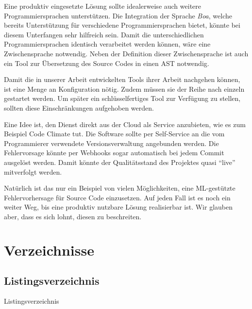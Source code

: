 \documentclass[10pt, a4paper]{article}
\makeatletter
\renewcommand{\lstlistingname}{Listingsverzeichnis}
\renewcommand\listoftables{%
	\subsection{\listtablename}%
	\@mkboth{\MakeUppercase\listtablename}%
	{\MakeUppercase\listtablename}%
	\@starttoc{lot}%
}
\renewcommand\listoffigures{%
	\subsection{\listfigurename}%
	\@mkboth{\MakeUppercase\listfigurename}%
	{\MakeUppercase\listfigurename}%
	\@starttoc{lof}%
}
\renewcommand\lstlistoflistings{%
	\subsection{\lstlistingname}%
	\@mkboth{\MakeUppercase\lstlistingname}%
	{\MakeUppercase\lstlistingname}%
	\@starttoc{lol}%
}
\makeatother
\begin{document}
Eine produktiv eingesetzte Lösung sollte idealerweise auch weitere Programmiersprachen unterstützen. Die Integration der Sprache \emph{Boa}, welche bereits Unterstützung für verschiedene Programmiersprachen bietet, könnte bei diesem Unterfangen sehr hilfreich sein. Damit die unterschiedlichen Programmiersprachen identisch verarbeitet werden können, wäre eine Zwischensprache notwendig. Neben der Definition dieser Zwischensprache ist auch ein Tool zur Übersetzung des Source Codes in einen \ac{AST} notwendig.

Damit die in unserer Arbeit entwickelten Tools ihrer Arbeit nachgehen kön\-nen, ist eine Menge an Konfiguration nötig. Zudem müssen sie der Reihe nach einzeln gestartet werden. Um später ein schlüsselfertiges Tool zur Verfügung zu stellen, sollten diese Einschränkungen aufgehoben werden.

Eine Idee ist, den Dienst direkt aus der Cloud als Service anzubieten, wie es zum Beispiel Code Climate \cite{codeclimate} tut. Die Software sollte per Self-Service an die vom Programmierer verwendete Versionsverwaltung angebunden werden. Die Fehlervorsage könnte per Webhooks \cite{githubwebhooks} sogar automatisch bei jedem Commit ausgelöst werden. Damit könnte der Qualitätsstand des Projektes quasi ``live'' mitverfolgt werden.

Natürlich ist das nur ein Beispiel von vielen Möglichkeiten, eine \ac{ML}-gestützte Fehlervorhersage für Source Code einzusetzen. Auf jeden Fall ist es noch ein weiter Weg, bis eine produktiv nutzbare Lösung realisierbar ist. Wir glauben aber, dass es sich lohnt, diesen zu beschreiten.

\section{Verzeichnisse}
\nocite{*}
\printbibliography[heading=subbibnumbered]

\lstlistoflistings

\listoffigures

\listoftables
\end{document}
